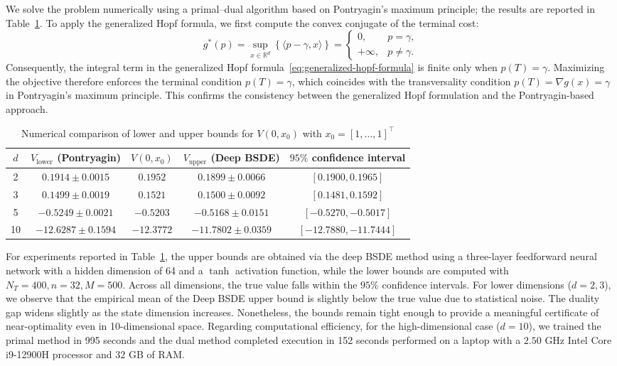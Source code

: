\documentclass[11pt]{article}
\numberwithin{equation}{section}
\theoremstyle{plain}
\theoremstyle{definition}
\theoremstyle{remark}
\newcommand{\R}{\mathbb{R}}
\begin{document}
We solve the problem numerically using a primal–dual algorithm based on Pontryagin’s maximum principle; the results are reported in Table~\ref{tab:bounds-ou-Pontryagin}. To apply the generalized Hopf formula, we first compute the convex conjugate of the terminal cost: 
\begin{equation*}
    g^*(p) = \sup_{x\in \R^d} \left\{ \langle p - \gamma, x\rangle \right\} = \begin{cases}
        0, &p = \gamma, \\
        +\infty, &p \ne \gamma. 
    \end{cases}
\end{equation*}
Consequently, the integral term in the generalized Hopf formula~\eqref{eq:generalized-hopf-formula} is finite only when $p(T)=\gamma$. Maximizing the objective therefore enforces the terminal condition $p(T)=\gamma$, which coincides with the transversality condition $p(T)=\nabla g(x)=\gamma$ in Pontryagin’s maximum principle. This confirms the consistency between the generalized Hopf formulation and the Pontryagin-based approach. 

\begin{table}[htbp!]
    \centering
    \begin{tabular}{ccccc}
        \hline 
        $d$ & $V_{\text{lower}}$ (Pontryagin) & $V(0,x_0)$ & $V_{\text{upper}}$ (Deep BSDE) & $95\%$ confidence interval \\
        \hline 
        2 & $0.1914 \pm 0.0015$ & $0.1952$ & $0.1899 \pm 0.0066$ & $[0.1900, 0.1965]$ \\
        3 & $0.1499 \pm 0.0019$ & $0.1521$ & $0.1500 \pm 0.0092$ & $[0.1481, 0.1592]$ \\
        5 & $-0.5249 \pm 0.0021$ & $-0.5203$ & $-0.5168 \pm 0.0151$ & $[-0.5270, -0.5017]$ \\
        10 & $-12.6287 \pm 0.1594$ & $-12.3772$ & $-11.7802 \pm 0.0359$ & $[-12.7880, -11.7444]$ \\
        \hline 
    \end{tabular}
    \caption{Numerical comparison of lower and upper bounds for $V(0,x_0)$ with $x_0 = [1, \dots, 1]^\top$}
    \label{tab:bounds-ou-Pontryagin}
\end{table}

For experiments reported in Table~\ref{tab:bounds-ou-Pontryagin}, the upper bounds are obtained via the deep BSDE method using a three-layer feedforward neural network with a hidden dimension of 64 and a $\tanh$ activation function, while the lower bounds are computed with $N_T=400, n=32, M=500$. 
Across all dimensions, the true value falls within the $95\%$ confidence intervals. For lower dimensions ($d=2, 3$), we observe that the empirical mean of the Deep BSDE upper bound is slightly below the true value due to statistical noise. The duality gap widens slightly as the state dimension increases. Nonetheless, the bounds remain tight enough to provide a meaningful certificate of near-optimality even in 10-dimensional space. 
Regarding computational efficiency, for the high-dimensional case ($d=10$), we trained the primal method in 995 seconds and the dual method completed execution in 152 seconds performed on a laptop with a $2.50$ GHz Intel Core i9-12900H processor and $32$ GB of RAM. 
\end{document}
